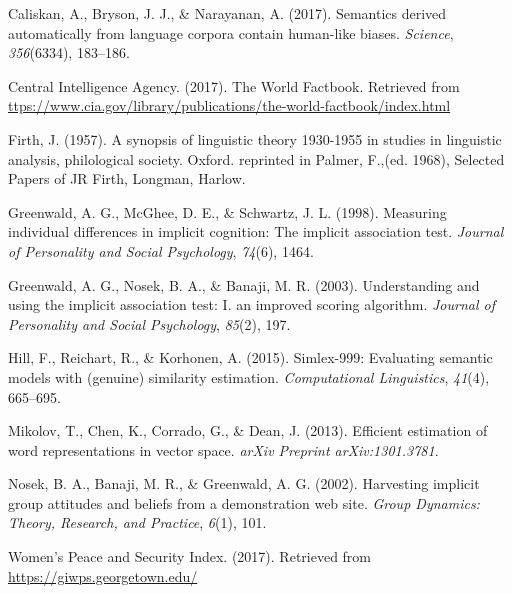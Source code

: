 \documentclass[10pt, letterpaper]{article}
\begin{document}
\hypertarget{ref-caliskan2017semantics}{}
Caliskan, A., Bryson, J. J., \& Narayanan, A. (2017). Semantics derived
automatically from language corpora contain human-like biases.
\emph{Science}, \emph{356}(6334), 183--186.

\hypertarget{ref-ciafactbook}{}
Central Intelligence Agency. (2017). The World Factbook. Retrieved from
\url{ttps://www.cia.gov/library/publications/the-world-factbook/index.html}

\hypertarget{ref-firth1957synopsis}{}
Firth, J. (1957). A synopsis of linguistic theory 1930-1955 in studies
in linguistic analysis, philological society. Oxford. reprinted in
Palmer, F.,(ed. 1968), Selected Papers of JR Firth, Longman, Harlow.

\hypertarget{ref-greenwald1998measuring}{}
Greenwald, A. G., McGhee, D. E., \& Schwartz, J. L. (1998). Measuring
individual differences in implicit cognition: The implicit association
test. \emph{Journal of Personality and Social Psychology}, \emph{74}(6),
1464.

\hypertarget{ref-greenwald2003understanding}{}
Greenwald, A. G., Nosek, B. A., \& Banaji, M. R. (2003). Understanding
and using the implicit association test: I. an improved scoring
algorithm. \emph{Journal of Personality and Social Psychology},
\emph{85}(2), 197.

\hypertarget{ref-hill2015simlex}{}
Hill, F., Reichart, R., \& Korhonen, A. (2015). Simlex-999: Evaluating
semantic models with (genuine) similarity estimation.
\emph{Computational Linguistics}, \emph{41}(4), 665--695.

\hypertarget{ref-mikolov2013efficient}{}
Mikolov, T., Chen, K., Corrado, G., \& Dean, J. (2013). Efficient
estimation of word representations in vector space. \emph{arXiv Preprint
arXiv:1301.3781}.

\hypertarget{ref-nosek2002harvesting}{}
Nosek, B. A., Banaji, M. R., \& Greenwald, A. G. (2002). Harvesting
implicit group attitudes and beliefs from a demonstration web site.
\emph{Group Dynamics: Theory, Research, and Practice}, \emph{6}(1), 101.

\hypertarget{ref-wps}{}
Women's Peace and Security Index. (2017). Retrieved from
\url{https://giwps.georgetown.edu/}
\end{document}
